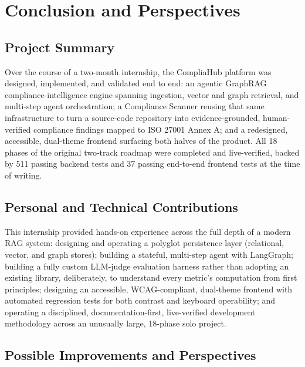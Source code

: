 \documentclass[12pt,a4paper]{report}
\begin{document}
\chapter{Conclusion and Perspectives}

\section{Project Summary}

Over the course of a two-month internship, the CompliaHub platform was
designed, implemented, and validated end to end: an agentic GraphRAG
compliance-intelligence engine spanning ingestion, vector and graph
retrieval, and multi-step agent orchestration; a Compliance Scanner reusing
that same infrastructure to turn a source-code repository into
evidence-grounded, human-verified compliance findings mapped to ISO 27001
Annex A; and a redesigned, accessible, dual-theme frontend surfacing both
halves of the product. All 18 phases of the original two-track roadmap were
completed and live-verified, backed by 511 passing backend tests and 37
passing end-to-end frontend tests at the time of writing.

\section{Personal and Technical Contributions}

This internship provided hands-on experience across the full depth of a
modern \ac{RAG} system: designing and operating a polyglot persistence layer
(relational, vector, and graph stores); building a stateful, multi-step
agent with LangGraph; building a fully custom \ac{LLM}-judge evaluation
harness rather than adopting an existing library, deliberately, to
understand every metric's computation from first principles; designing an
accessible, \ac{WCAG}-compliant, dual-theme frontend with automated
regression tests for both contrast and keyboard operability; and operating
a disciplined, documentation-first, live-verified development methodology
across an unusually large, 18-phase solo project.

\section{Possible Improvements and Perspectives}
\end{document}
